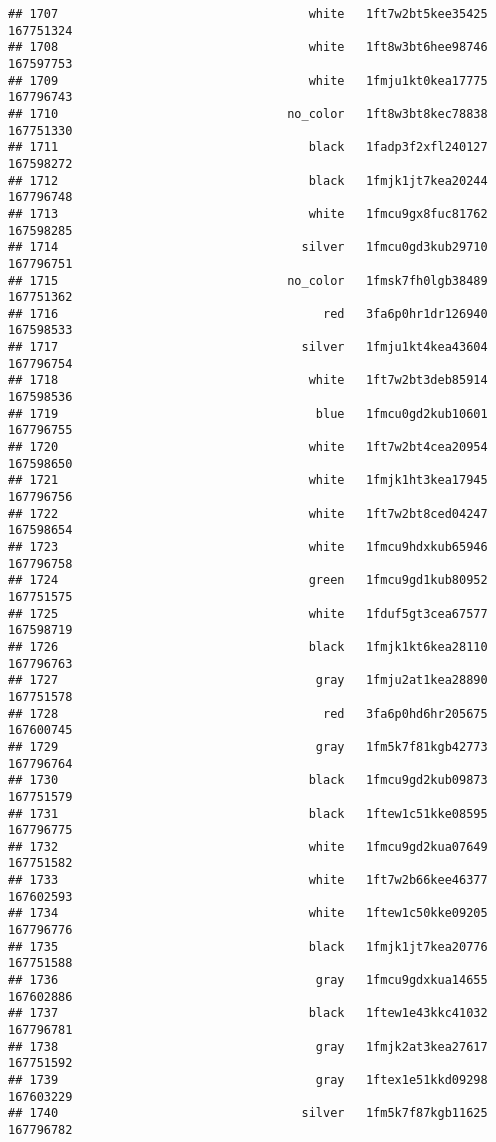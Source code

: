 \documentclass[
]{article}
\begin{document}
\begin{verbatim}
## 1707                                   white   1ft7w2bt5kee35425 167751324
## 1708                                   white   1ft8w3bt6hee98746 167597753
## 1709                                   white   1fmju1kt0kea17775 167796743
## 1710                                no_color   1ft8w3bt8kec78838 167751330
## 1711                                   black   1fadp3f2xfl240127 167598272
## 1712                                   black   1fmjk1jt7kea20244 167796748
## 1713                                   white   1fmcu9gx8fuc81762 167598285
## 1714                                  silver   1fmcu0gd3kub29710 167796751
## 1715                                no_color   1fmsk7fh0lgb38489 167751362
## 1716                                     red   3fa6p0hr1dr126940 167598533
## 1717                                  silver   1fmju1kt4kea43604 167796754
## 1718                                   white   1ft7w2bt3deb85914 167598536
## 1719                                    blue   1fmcu0gd2kub10601 167796755
## 1720                                   white   1ft7w2bt4cea20954 167598650
## 1721                                   white   1fmjk1ht3kea17945 167796756
## 1722                                   white   1ft7w2bt8ced04247 167598654
## 1723                                   white   1fmcu9hdxkub65946 167796758
## 1724                                   green   1fmcu9gd1kub80952 167751575
## 1725                                   white   1fduf5gt3cea67577 167598719
## 1726                                   black   1fmjk1kt6kea28110 167796763
## 1727                                    gray   1fmju2at1kea28890 167751578
## 1728                                     red   3fa6p0hd6hr205675 167600745
## 1729                                    gray   1fm5k7f81kgb42773 167796764
## 1730                                   black   1fmcu9gd2kub09873 167751579
## 1731                                   black   1ftew1c51kke08595 167796775
## 1732                                   white   1fmcu9gd2kua07649 167751582
## 1733                                   white   1ft7w2b66kee46377 167602593
## 1734                                   white   1ftew1c50kke09205 167796776
## 1735                                   black   1fmjk1jt7kea20776 167751588
## 1736                                    gray   1fmcu9gdxkua14655 167602886
## 1737                                   black   1ftew1e43kkc41032 167796781
## 1738                                    gray   1fmjk2at3kea27617 167751592
## 1739                                    gray   1ftex1e51kkd09298 167603229
## 1740                                  silver   1fm5k7f87kgb11625 167796782

\end{verbatim}
\end{document}
